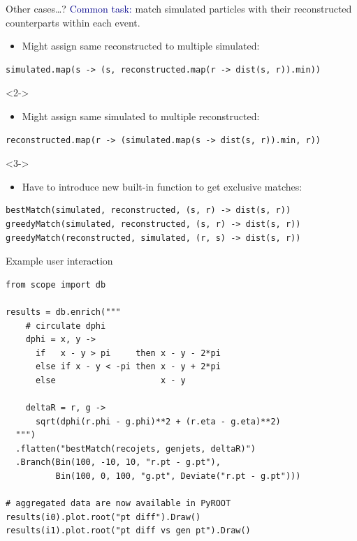 \documentclass{beamer}
\begin{document}
\begin{frame}[fragile]{Other cases\ldots?}
\vspace{0.5 cm}
\textcolor{darkblue}{Common task:} match simulated particles with their reconstructed counterparts within each event.

\vspace{0.25 cm}
\begin{itemize}
\item Might assign same reconstructed to multiple simulated:
\end{itemize}
\scriptsize
\begin{verbatim}
simulated.map(s -> (s, reconstructed.map(r -> dist(s, r)).min))
\end{verbatim}
\normalsize

\vspace{0.25 cm}
\begin{uncoverenv}<2->
\begin{itemize}
\item Might assign same simulated to multiple reconstructed:
\end{itemize}
\scriptsize
\begin{verbatim}
reconstructed.map(r -> (simulated.map(s -> dist(s, r)).min, r))
\end{verbatim}
\normalsize
\end{uncoverenv}

\vspace{0.25 cm}
\begin{uncoverenv}<3->
\begin{itemize}
\item Have to introduce new built-in function to get exclusive matches:
\end{itemize}
\scriptsize
\begin{verbatim}
bestMatch(simulated, reconstructed, (s, r) -> dist(s, r))
greedyMatch(simulated, reconstructed, (s, r) -> dist(s, r))
greedyMatch(reconstructed, simulated, (r, s) -> dist(s, r))
\end{verbatim}
\normalsize
\end{uncoverenv}
\end{frame}

\begin{frame}[fragile]{Example user interaction}
\scriptsize
\begin{verbatim}
from scope import db

results = db.enrich("""
    # circulate dphi
    dphi = x, y ->
      if   x - y > pi     then x - y - 2*pi
      else if x - y < -pi then x - y + 2*pi
      else                     x - y

    deltaR = r, g ->
      sqrt(dphi(r.phi - g.phi)**2 + (r.eta - g.eta)**2)
  """)
  .flatten("bestMatch(recojets, genjets, deltaR)")
  .Branch(Bin(100, -10, 10, "r.pt - g.pt"),
          Bin(100, 0, 100, "g.pt", Deviate("r.pt - g.pt")))

# aggregated data are now available in PyROOT
results(i0).plot.root("pt diff").Draw()
results(i1).plot.root("pt diff vs gen pt").Draw()
\end{verbatim}
\end{frame}
\end{document}
